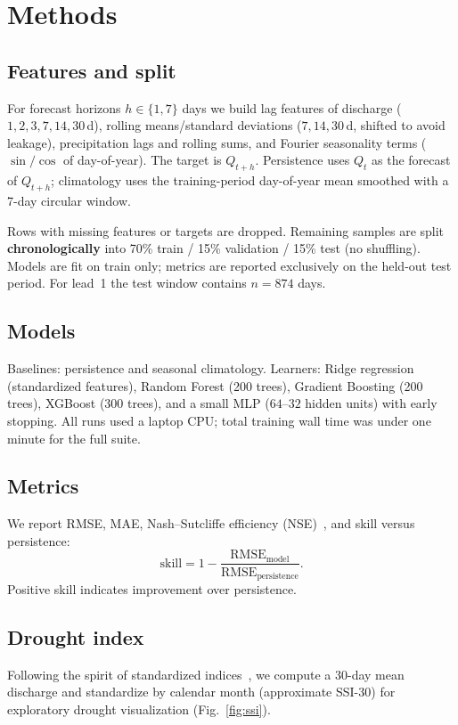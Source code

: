 \documentclass[graybox]{svmult}
\begin{document}
\section{Methods}
\label{sec:methods}
\subsection{Features and split}
For forecast horizons $h\in\{1,7\}$ days we build lag features of discharge ($1,2,3,7,14,30$\,d), rolling means/standard deviations ($7,14,30$\,d, shifted to avoid leakage), precipitation lags and rolling sums, and Fourier seasonality terms ($\sin/\cos$ of day-of-year). The target is $Q_{t+h}$. Persistence uses $Q_t$ as the forecast of $Q_{t+h}$; climatology uses the training-period day-of-year mean smoothed with a 7-day circular window.

Rows with missing features or targets are dropped. Remaining samples are split \textbf{chronologically} into 70\% train / 15\% validation / 15\% test (no shuffling). Models are fit on train only; metrics are reported exclusively on the held-out test period. For lead~1 the test window contains $n=874$ days.

\subsection{Models}
Baselines: persistence and seasonal climatology. Learners: Ridge regression (standardized features), Random Forest (200 trees), Gradient Boosting (200 trees), XGBoost (300 trees), and a small MLP ($64$--$32$ hidden units) with early stopping. All runs used a laptop CPU; total training wall time was under one minute for the full suite.

\subsection{Metrics}
We report RMSE, MAE, Nash--Sutcliffe efficiency (NSE)~\cite{nash1970river}, and skill versus persistence:
\begin{equation}
\mathrm{skill}=1-\frac{\mathrm{RMSE}_{\mathrm{model}}}{\mathrm{RMSE}_{\mathrm{persistence}}}.
\end{equation}
Positive skill indicates improvement over persistence.

\subsection{Drought index}
Following the spirit of standardized indices~\cite{mckee1993spi}, we compute a 30-day mean discharge and standardize by calendar month (approximate SSI-30) for exploratory drought visualization (Fig.~\ref{fig:ssi}).
\end{document}
